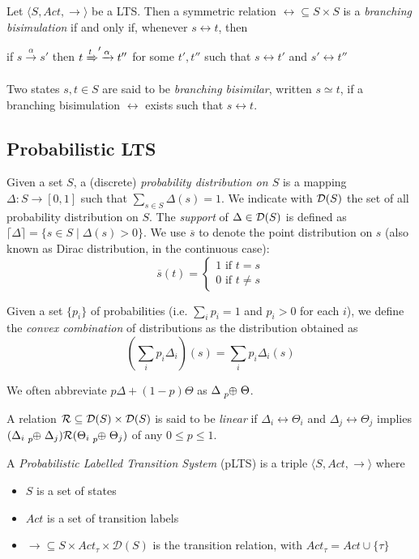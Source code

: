 Let $\langle S , Act, \rightarrow \rangle$ be a LTS. Then a symmetric relation $\rel \subseteq S \times S$ is a \textit{branching bisimulation} if and only if, whenever $s \rel t$, then 
\begin{center}
if $s \xrightarrow{\alpha} s'$ then $t \xRightarrow t' \xrightarrow{\alpha} t''$ for some $t', t''$ such that $s \rel t'$ and $s' \rel t''$
\end{center}
Two states $s, t \in S$ are said to be \textit{branching bisimilar}, written $s \simeq t$, if a branching bisimulation $\rel$ exists such that $s \rel t$.

\subsection{Probabilistic LTS} \label{pLTS}

Given a set $S$, a (discrete) \textit{probability distribution on $S$} is a mapping $\Delta: S \rightarrow [0, 1]$ such that $\sum_{s\in S} \Delta(s) = 1$. We indicate with $\mathcal{D}(S)$ the set of all probability distribution on $S$.
The \textit{support} of $\Delta \in \mathcal{D}(S)$ is defined as $\lceil\Delta\rceil = \{s \in S \mid \Delta(s) > 0\}$. We use $\overline{s}$ to denote the point distribution on $s$ (also known as Dirac distribution, in the continuous case):
\[
	\overline{s}(t) = 
	\begin{cases} 1 \text{ if }t = s \\
	0 \text{ if } t\neq s
	\end{cases}
\]

Given a set $\{p_i\}$ of probabilities (i.e. $\sum_i p_i = 1$ and $p_i > 0$ for each $i$), we define the \textit{convex combination} of distributions as the distribution obtained as
\[
\left(\sum_i p_i \Delta_i\right)(s) = \sum_i p_i \Delta_i(s)
\]

We often abbreviate $p \Delta + (1-p) \Theta$ as $\Delta \psum{p} \Theta$.


A relation $\mathcal{R} \subseteq \mathcal{D}(S) \times \mathcal{D}(S)$ is said to be \textit{linear} if $\Delta_i \rel \Theta_i$ and $\Delta_j \rel \Theta_j$ implies $(\Delta_i \psum{p} \Delta_j) \rel (\Theta_i \psum{p} \Theta_j)$ of any $0 \leq p \leq 1$.


A \textit{Probabilistic Labelled Transition System} (pLTS) is a triple $\langle S , Act, \rightarrow \rangle$ where \begin{itemize}
\item $S$ is a set of states
\item $Act$ is a set of transition labels
\item $\rightarrow 	\subseteq S\times Act_\tau \times \mathcal{D}(S)$ is the transition relation, with $Act_\tau = Act \cup \{\tau\}$
\end{itemize} 

